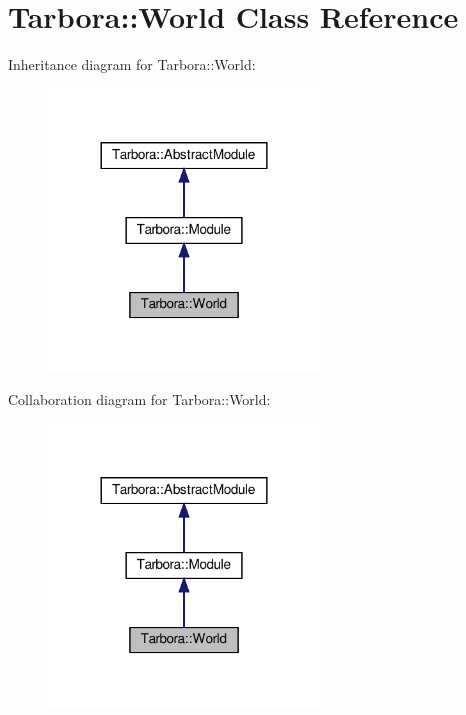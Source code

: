 \hypertarget{classTarbora_1_1World}{}\section{Tarbora\+:\+:World Class Reference}
\label{classTarbora_1_1World}


Inheritance diagram for Tarbora\+:\+:World\+:
\nopagebreak
\begin{figure}[H]
\begin{center}
\leavevmode
\includegraphics[width=204pt]{classTarbora_1_1World__inherit__graph}
\end{center}
\end{figure}


Collaboration diagram for Tarbora\+:\+:World\+:
\nopagebreak
\begin{figure}[H]
\begin{center}
\leavevmode
\includegraphics[width=204pt]{classTarbora_1_1World__coll__graph}
\end{center}
\end{figure}

